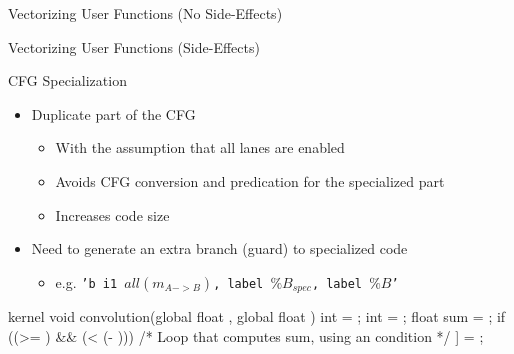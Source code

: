 
\begin{frame}{Vectorizing User Functions (No Side-Effects)}


\end{frame}


\begin{frame}{Vectorizing User Functions (Side-Effects)}


\end{frame}


\begin{frame}[fragile]{CFG Specialization}

\begin{itemize}
    \item Duplicate part of the CFG
    \begin{itemize}
        \item With the assumption that all lanes are enabled
        \item Avoids CFG conversion and predication for the specialized part
        \item Increases code size
    \end{itemize}
    \item Need to generate an extra branch (guard) to specialized code
    \begin{itemize}
        \item e.g. \texttt{'b i1 $all(m_{A->B})$, label $\%B_{spec}$, label $\%B$'}
    \end{itemize}
\end{itemize}

\begin{codebox}[commandchars=\\\[\]]
kernel void convolution(global float \uniform[*src], global float \uniform[*dst]) {
  int \varying[x] = ;
  int \uniform[width] = ;
  float sum = \uniform[0.0f];
  if ((\varying[x] >= ) && (\varying[x] < (\uniform[width] - ))) {
    /* Loop that computes sum, using an \uniform[uniform] condition */
  }
  \uniform[dst]\idx[\varying[x]] = \varying[sum];
}
\end{codebox}

\end{frame}

